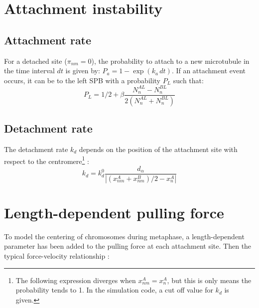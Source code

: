 \documentclass[a4paper,12pt]{article}
\begin{document}
\newpage
\section{Attachment instability}

\subsection{Attachment rate}

For a detached site ($\pi_{nm} = 0$), the probability to attach to a
new microtubule in the time interval $dt$ is given by: $P_a = 1 -
\exp(k_a\,dt)$. If an attachment event occurs, it can be to the left
SPB with a probability $P_L$ such that:
\begin{equation}
  \label{eq:p_left}
  P_L =  1/2 + \beta \frac{N_n^{AL} - N_n^{BL}}{2(N_n^{AL} + N_n^{BL})}
\end{equation}

\subsection{Detachment rate}

The detachment rate $k_d$ depends on the position of the attachment
site with respect to the centromere\footnote{The following expression
  diverges when $ x_{nm}^A = x_n^A $, but this is only means the
  probability tends to 1. In the simulation code, a cut off value for
  $k_d$ is given.} :
\begin{equation}
  \label{eq:k_det}
  k_d = k_d^0 \frac{d_\alpha}{|(x_{nm}^A + x_{nm}^B)/2 - x_n^A|}
\end{equation}


\section{Length-dependent pulling force}

To model the centering of chromosomes during metaphase, a length-dependent parameter has been added to the pulling force at each attachment site. Then the typical force-velocity relationship : 
 
\end{document}
